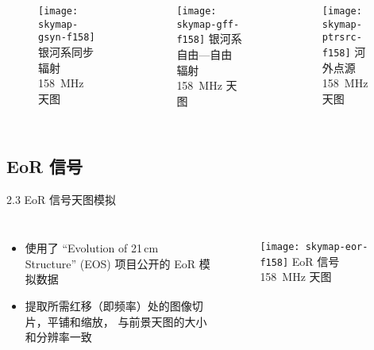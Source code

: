 \documentclass{beamer}
\begin{document}
\begin{frame}[c]
  \begin{columns}
    \begin{figure}
      \centering
      \texttt{[image: skymap-gsyn-f158]}
      银河系同步辐射\\\SI{158}{\MHz} 天图
    \end{figure}

    \begin{figure}
      \centering
      \texttt{[image: skymap-gff-f158]}
      银河系自由—自由辐射\\\SI{158}{\MHz} 天图
    \end{figure}

    \begin{figure}
      \centering
      \texttt{[image: skymap-ptrsrc-f158]}
      河外点源\\\SI{158}{\MHz} 天图
    \end{figure}
  \end{columns}
\end{frame}

\subsection{EoR 信号}

\begin{frame}{2.3 EoR 信号天图模拟}
  \begin{columns}
    \begin{itemize}
      \item 使用了 \enquote{Evolution of 21\,cm Structure} (EOS)
        项目公开的 EoR 模拟数据
      \item 提取所需红移（即频率）处的图像切片，平铺和缩放，
        与前景天图的大小和分辨率一致
    \end{itemize}

    \begin{figure}
      \centering
      \texttt{[image: skymap-eor-f158]}
      EoR 信号 \SI{158}{\MHz} 天图
    \end{figure}
  \end{columns}
\end{frame}

\end{document}
